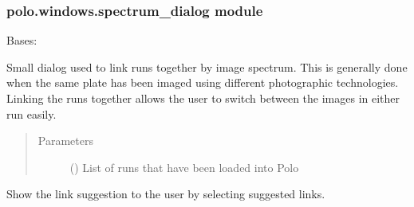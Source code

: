 \documentclass[letterpaper,10pt,english]{sphinxmanual}
\begin{document}
\subsubsection{polo.windows.spectrum\_dialog module}
\label{\detokenize{polo.windows:module-polo.windows.spectrum_dialog}}\label{\detokenize{polo.windows:polo-windows-spectrum-dialog-module}}

\begin{fulllineitems}
\label{\detokenize{polo.windows:polo.windows.spectrum_dialog.SpectrumDialog}}
Bases: 

Small dialog used to link runs together by image spectrum. This is
generally done when the same plate has been imaged using different
photographic technologies. Linking the runs together allows the user to
switch between the images in either run easily.
\begin{quote}\begin{description}
\item[{Parameters}] \leavevmode
{} () \textendash{} List of runs that have been loaded into Polo

\end{description}\end{quote}

\begin{fulllineitems}
\label{\detokenize{polo.windows:polo.windows.spectrum_dialog.SpectrumDialog.display_suggestion}}
Show the link suggestion to the user by selecting suggested links.

\end{fulllineitems}


\end{fulllineitems}
\end{document}
